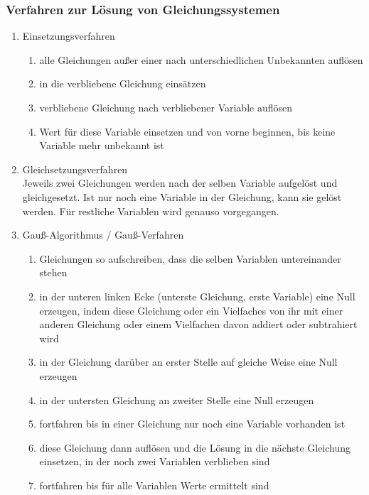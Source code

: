 \documentclass{article}
\begin{document}
  \subsubsection{Verfahren zur Lösung von Gleichungssystemen}
  \begin{enumerate}
  	\item Einsetzungsverfahren
  	\begin{enumerate}
  		\item alle Gleichungen außer einer nach unterschiedlichen Unbekannten auflösen
  		\item in die verbliebene Gleichung einsätzen
  		\item verbliebene Gleichung nach verbliebener Variable auflösen
  		\item Wert für diese Variable einsetzen und von vorne beginnen, bis keine Variable mehr unbekannt ist
  	\end{enumerate}
  	\item Gleichsetzungsverfahren \\
  	Jeweils zwei Gleichungen werden nach der selben Variable aufgelöst und gleichgesetzt. Ist nur noch eine Variable in der Gleichung, kann sie gelöst werden. Für restliche Variablen wird genauso vorgegangen.
  	\item Gauß-Algorithmus / Gauß-Verfahren
  	\begin{enumerate}
  		\item Gleichungen so aufschreiben, dass die selben Variablen untereinander stehen
  		\item in der unteren linken Ecke (unterste Gleichung, erste Variable) eine Null erzeugen, indem diese Gleichung oder ein Vielfaches von ihr mit einer anderen Gleichung oder einem Vielfachen davon addiert oder subtrahiert wird
  		\item in der Gleichung darüber an erster Stelle auf gleiche Weise eine Null erzeugen
  		\item in der untersten Gleichung an zweiter Stelle eine Null erzeugen
  		\item fortfahren bis in einer Gleichung nur noch eine Variable vorhanden ist
  		\item diese Gleichung dann auflösen und die Lösung in die nächste Gleichung einsetzen, in der noch zwei Variablen verblieben sind
  		\item fortfahren bis für alle Variablen Werte ermittelt sind
  	\end{enumerate}
  \end{enumerate}
  
\end{document}
